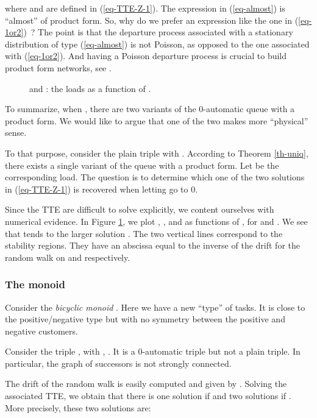 \documentclass[11pt,a4paper]{article}
\theoremstyle{remark}
\def\eref#1{(\ref{#1})}
\begin{document}
where  and  are defined in \eref{eq-TTE-Z-1}.
The expression in \eref{eq-almost} is ``almost'' of product form. So, why do we
prefer an expression like the one in \eref{eq-1or2}~?
The point is that the departure process associated with a
stationary distribution of type \eref{eq-almost} is not Poisson, as opposed to
the one associated with \eref{eq-1or2}. And having a Poisson departure
process is crucial
to build product form networks, see \cite{DaMa06}.

\begin{figure}[ht]

\caption{ and : the loads as a
  function of .}
\label{fi-a-petit c}
\end{figure}

To summarize, when , there are two variants of the 0-automatic
queue with a product form.
We would like to argue that one of the two
makes more ``physical'' sense.

To that purpose,
consider the plain triple  with .
According to
Theorem \ref{th-uniq}, there exists a single variant of the queue with a
product form. Let  be the corresponding load. The question is to
determine which one of the two 
solutions in \eref{eq-TTE-Z-1} is recovered when letting  go to
0.

Since the TTE are difficult to solve explicitly, we content
ourselves with numerical evidence. In Figure \ref{fi-a-petit c},
we plot , , and  as functions
of , for  and . We see
that  tends to the larger solution . The two
vertical lines correspond to the stability regions. They have an
abscissa equal to the inverse of the drift 
 for the random walk on 
and  respectively.


\subsubsection{The monoid }

Consider the {\em bicyclic monoid} . Here we have
a new ``type'' 
of tasks. It is close to the positive/negative type but with no
symmetry between the positive and negative customers. 

Consider the triple , with
, . It is a 0-automatic triple but not a plain
triple. In particular, the graph of successors 
is not strongly connected. 

The drift of the random walk is easily
computed and given by .
Solving the associated TTE, we obtain that there is one solution
if  and two solutions if . More precisely,
these two solutions are:
\end{document}
